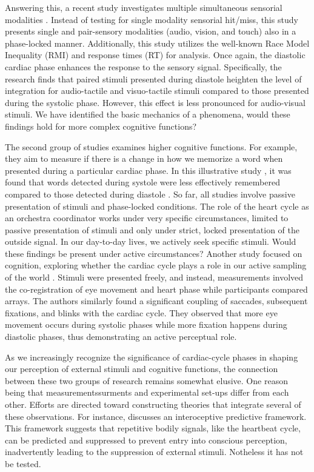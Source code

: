 \documentclass[12pt,oneside,openright]{report}
\begin{document}
Answering this, a recent study investigates multiple simultaneous sensorial modalities \parencite{SALTAFOSSI2023108642}. Instead of testing for single modality sensorial hit/miss, this study presents single and pair-sensory modalities (audio, vision, and touch) also in a phase-locked manner. Additionally, this study utilizes the well-known Race Model Inequality (RMI) and response times (RT) for analysis. Once again, the diastolic cardiac phase enhances the response to the sensory signal. Specifically, the research finds that paired stimuli presented during diastole heighten the level of integration for audio-tactile and visuo-tactile stimuli compared to those presented during the systolic phase. However, this effect is less pronounced for audio-visual stimuli. We have identified the basic mechanics of a phenomena, would these findings hold for more complex cognitive functions?

The second group of studies examines higher cognitive functions. For example, they aim to measure if there is a change in how we memorize a word when presented during a particular cardiac phase. In this illustrative study \parencite{Garfinkel2013-st}, it was found that words detected during systole were less effectively remembered compared to those detected during diastole \parencite{Garfinkel2013-st}. So far, all studies involve passive presentation of stimuli and phase-locked conditions. The role of the heart cycle as an orchestra coordinator works under very specific circumstances, limited to passive presentation of stimuli and only under strict, locked presentation of the outside signal. In our day-to-day lives, we actively seek specific stimuli. Would these findings be present under active circumstances?
Another study focused on cognition, exploring whether the cardiac cycle plays a role in our active sampling of the world \parencite{GalvezPol2018ActiveSI}. Stimuli were presented freely, and instead, measurements involved the co-registration of eye movement and heart phase while participants compared arrays. The authors similarly found a significant coupling of saccades, subsequent fixations, and blinks with the cardiac cycle. They observed that more eye movement occurs during systolic phases while more fixation happens during diastolic phases, thus demonstrating an active perceptual role.

As we increasingly recognize the significance of cardiac-cycle phases in shaping our perception of external stimuli and cognitive functions, the connection between these two groups of research remains somewhat elusive. One reason being that measurementssurments and experimental set-ups differ from each other. Efforts are directed toward constructing theories that integrate several of these observations. For instance, \parencite{AL2021118247} discusses an interoceptive predictive framework. This framework suggests that repetitive bodily signals, like the heartbeat cycle, can be predicted and suppressed to prevent entry into conscious perception, inadvertently leading to the suppression of external stimuli. Notheless it has not be tested. 
\end{document}

